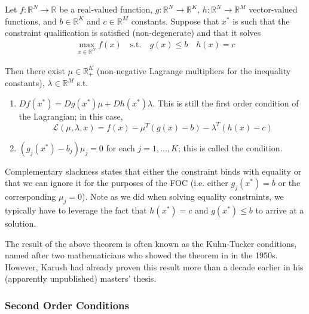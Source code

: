 \documentclass{article}
\begin{document}
\begin{theorem}\label{thm:lecture5_kkt}
  Let $f: \mathbb{R}^N \to \mathbb{R}$ be a real-valued function, $g: \mathbb{R}^N \to \mathbb{R}^K$, $h: \mathbb{R}^N \to \mathbb{R}^M$ vector-valued functions, and $b \in \mathbb{R}^K$ and $c \in \mathbb{R}^M$ constants. Suppose that $x^*$ is such that the constraint qualification is satisfied (non-degenerate) and that it solves
  \begin{align*}
    \max_{x \in \mathbb{R}^N} f(x)
    \quad
    \text{s.t.}
    \quad
    g(x) \le b
    \quad
    h(x) = c
  \end{align*}

  Then there exist $\mu \in \mathbb{R}^K_{+}$ (non-negative Lagrange multipliers for the inequality constants), $\lambda \in \mathbb{R}^M$ s.t.
  \begin{enumerate}
    \item $Df(x^*) = Dg(x^*) \mu + Dh(x^*)\lambda$. This is still the first order condition of the Lagrangian; in this case,
      \[
        \mathcal{L}(\mu, \lambda, x) = f(x) - \mu^T (g(x) - b) - \lambda^T (h(x) - c)
      \]

    \item $(g_j(x^*) - b_j) \mu_j = 0$ for each $j = 1, \ldots, K$; this is called the  condition.
  \end{enumerate}
\end{theorem}

Complementary slackness states that either the constraint binds with equality or that we can ignore it for the purposes of the FOC (i.e. either $g_j(x^*) = b$ or the corresponding $\mu_j = 0$). Note as we did when solving equality constraints, we typically have to leverage the fact that $h(x^*) = c$ and $g(x^*) \le b$ to arrive at a solution.

\begin{remark}
  The result of the above theorem is often known as the Kuhn-Tucker conditions, named after two mathematicians who showed the theorem in in the 1950s. However, Karush had already proven this result more than a decade earlier in his (apparently unpublished) masters' thesis.
\end{remark}

\subsubsection{Second Order Conditions}
\label{ssub:second_order_conditions}
\end{document}

